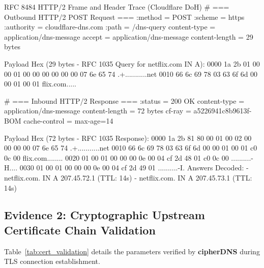 \documentclass[10pt,a4paper]{article}
\begin{document}
\begin{protocollog}{RFC 8484 HTTP/2 Frame and Header Trace (Cloudflare DoH)}
# === Outbound HTTP/2 POST Request ===
:method         = POST
:scheme         = https
:authority      = cloudflare-dns.com
:path           = /dns-query
content-type    = application/dns-message
accept          = application/dns-message
content-length  = 29 bytes

Payload Hex (29 bytes - RFC 1035 Query for netflix.com IN A):
0000   1a 2b 01 00 00 01 00 00  00 00 00 00 07 6e 65 74   .+...........net
0010   66 6c 69 78 03 63 6f 6d  00 00 01 00 01            flix.com.....

# === Inbound HTTP/2 Response ===
:status         = 200 OK
content-type    = application/dns-message
content-length  = 72 bytes
cf-ray          = a5226941c8b9613f-BOM
cache-control   = max-age=14

Payload Hex (72 bytes - RFC 1035 Response):
0000   1a 2b 81 80 00 01 00 02  00 00 00 00 07 6e 65 74   .+...........net
0010   66 6c 69 78 03 63 6f 6d  00 00 01 00 01 c0 0c 00   flix.com........
0020   01 00 01 00 00 00 0e 00  04 cf 2d 48 01 c0 0c 00   ..........-H....
0030   01 00 01 00 00 00 0e 00  04 cf 2d 49 01            ..........-I.
Answers Decoded:
- netflix.com. IN A 207.45.72.1 (TTL: 14s)
- netflix.com. IN A 207.45.73.1 (TTL: 14s)
\end{protocollog}

\subsection{Evidence 2: Cryptographic Upstream Certificate Chain Validation}
Table~\ref{tab:cert_validation} details the parameters verified by \textbf{cipherDNS} during TLS connection establishment.
\end{document}
